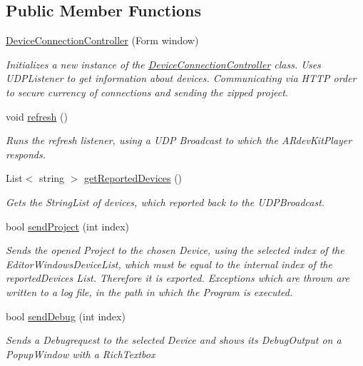 \subsection*{Public Member Functions}
\begin{DoxyCompactItemize}
\item 
\hyperlink{class_a_rdev_kit_1_1_controller_1_1_connections_1_1_device_connection_1_1_device_connection_controller_a6d505b2d3b51a10e9d83058157a1c62c}{Device\-Connection\-Controller} (Form window)
\begin{DoxyCompactList}\small\item\em Initializes a new instance of the \hyperlink{class_a_rdev_kit_1_1_controller_1_1_connections_1_1_device_connection_1_1_device_connection_controller}{Device\-Connection\-Controller} class. Uses U\-D\-P\-Listener to get information about devices. Communicating via H\-T\-T\-P order to secure currency of connections and sending the zipped project. \end{DoxyCompactList}\item 
void \hyperlink{class_a_rdev_kit_1_1_controller_1_1_connections_1_1_device_connection_1_1_device_connection_controller_a2fa2baab02402dec9c2dce90fadeb54c}{refresh} ()
\begin{DoxyCompactList}\small\item\em Runs the refresh listener, using a U\-D\-P Broadcast to which the A\-Rdev\-Kit\-Player responds. \end{DoxyCompactList}\item 
List$<$ string $>$ \hyperlink{class_a_rdev_kit_1_1_controller_1_1_connections_1_1_device_connection_1_1_device_connection_controller_a22af53d2338217cf5c77e4f7326cee79}{get\-Reported\-Devices} ()
\begin{DoxyCompactList}\small\item\em Gets the String\-List of devices, which reported back to the U\-D\-P\-Broadcast. \end{DoxyCompactList}\item 
bool \hyperlink{class_a_rdev_kit_1_1_controller_1_1_connections_1_1_device_connection_1_1_device_connection_controller_a4fcdf74b36bf40335dfe5179f78f2524}{send\-Project} (int index)
\begin{DoxyCompactList}\small\item\em Sends the opened Project to the chosen Device, using the selected index of the Editor\-Windows\-Device\-List, which must be equal to the internal index of the reported\-Devices List. Therefore it is exported. Exceptions which are thrown are written to a log file, in the path in which the Program is executed. \end{DoxyCompactList}\item 
bool \hyperlink{class_a_rdev_kit_1_1_controller_1_1_connections_1_1_device_connection_1_1_device_connection_controller_a2810b006ae43957884b041496f4f3498}{send\-Debug} (int index)
\begin{DoxyCompactList}\small\item\em Sends a Debugrequest to the selected Device and shows its Debug\-Output on a Popup\-Window with a Rich\-Textbox \end{DoxyCompactList}\end{DoxyCompactItemize}
